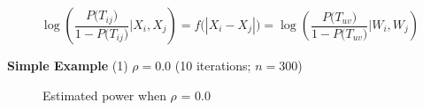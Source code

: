 \documentclass[12pt]{report}
\begin{document}
\begin{equation}
\label{eq:latentspace}
\log \left( \frac{P\big( T_{ij} \big) }{1 - P\big( T_{ij}    \big) } \big| X_i, X_j \right) = f \big( | X_i - X_j |  \big) = \log \left( \frac{P\big( T_{uv} \big) }{1 - P\big( T_{uv}    \big) } \big|W_i, W_j   \right)
\end{equation}


\textbf{Simple Example}
(1) $\rho = 0.0$ (10 iterations; $n = 300$)


\begin{figure}[H]
\captionsetup{format=plain}
\centering
{}
\caption{Estimated power when $\rho$ = 0.0}
\label{fig:test1}    
\end{figure} 
\end{document}
